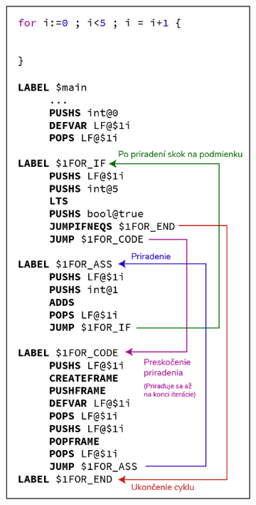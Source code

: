 \documentclass[a4paper,11pt]{article}
\begin{document}
			\cleardoublepage
			\begin{figure}[h!]
				\centering
				\begin{subfigure}[h]{0.4\textwidth}
					\includegraphics[width=\textwidth]{codes/for.jpg}\\

\end{subfigure}
\end{figure}
\end{document}
